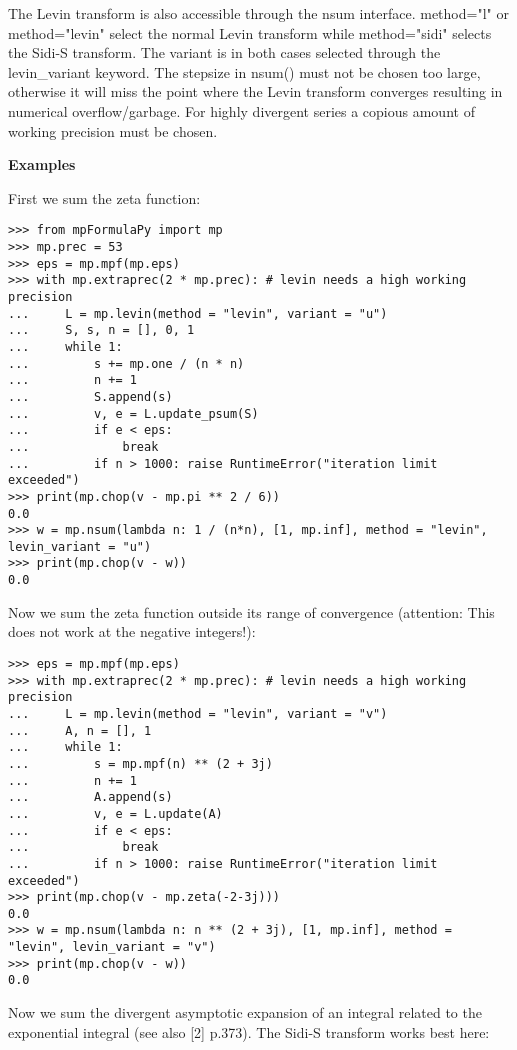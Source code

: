 The Levin transform is also accessible through the nsum interface. method="l" or method="levin" select the normal Levin transform while method="sidi" selects the Sidi-S transform. The variant is in both cases selected through the levin\_variant keyword. The stepsize in nsum() must not be chosen too large, otherwise it will miss the point where the Levin transform converges resulting in numerical overflow/garbage.
For highly divergent series a copious amount of working precision must be chosen.

\vpara
\textbf{Examples}

First we sum the zeta function:

\begin{lstlisting}
>>> from mpFormulaPy import mp
>>> mp.prec = 53
>>> eps = mp.mpf(mp.eps)
>>> with mp.extraprec(2 * mp.prec): # levin needs a high working precision
...     L = mp.levin(method = "levin", variant = "u")
...     S, s, n = [], 0, 1
...     while 1:
...         s += mp.one / (n * n)
...         n += 1
...         S.append(s)
...         v, e = L.update_psum(S)
...         if e < eps:
...             break
...         if n > 1000: raise RuntimeError("iteration limit exceeded")
>>> print(mp.chop(v - mp.pi ** 2 / 6))
0.0
>>> w = mp.nsum(lambda n: 1 / (n*n), [1, mp.inf], method = "levin", levin_variant = "u")
>>> print(mp.chop(v - w))
0.0
\end{lstlisting}

Now we sum the zeta function outside its range of convergence (attention: This does not work at the negative integers!):

\begin{lstlisting}
>>> eps = mp.mpf(mp.eps)
>>> with mp.extraprec(2 * mp.prec): # levin needs a high working precision
...     L = mp.levin(method = "levin", variant = "v")
...     A, n = [], 1
...     while 1:
...         s = mp.mpf(n) ** (2 + 3j)
...         n += 1
...         A.append(s)
...         v, e = L.update(A)
...         if e < eps:
...             break
...         if n > 1000: raise RuntimeError("iteration limit exceeded")
>>> print(mp.chop(v - mp.zeta(-2-3j)))
0.0
>>> w = mp.nsum(lambda n: n ** (2 + 3j), [1, mp.inf], method = "levin", levin_variant = "v")
>>> print(mp.chop(v - w))
0.0
\end{lstlisting}

Now we sum the divergent asymptotic expansion of an integral related to the exponential integral (see also [2] p.373). The Sidi-S transform works best here:

